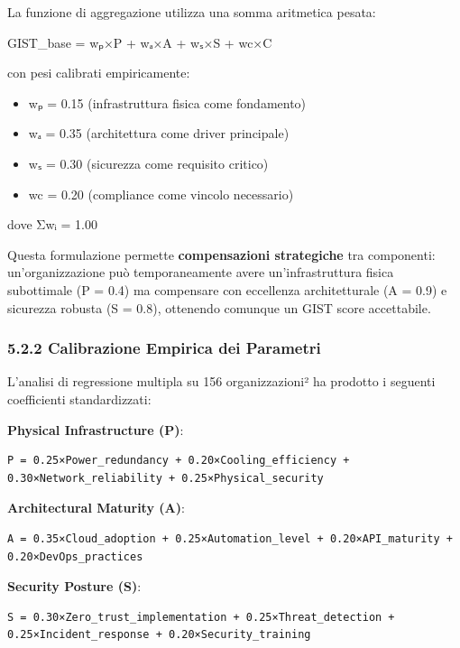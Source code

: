 \documentclass[12pt,a4paper,oneside]{book}
\providecommand{\tightlist}{%
  \setlength{\itemsep}{0pt}\setlength{\parskip}{0pt}
}
\begin{document}
La funzione di aggregazione utilizza una somma aritmetica pesata:

GIST\_base = wₚ×P + wₐ×A + wₛ×S + wc×C

con pesi calibrati empiricamente:

\begin{itemize}
\tightlist
\item
  wₚ = 0.15 (infrastruttura fisica come fondamento)\\
\item
  wₐ = 0.35 (architettura come driver principale)\\
\item
  wₛ = 0.30 (sicurezza come requisito critico)\\
\item
  wc = 0.20 (compliance come vincolo necessario)
\end{itemize}

dove Σwᵢ = 1.00

Questa formulazione permette \textbf{compensazioni strategiche} tra
componenti: un'organizzazione può temporaneamente avere
un'infrastruttura fisica subottimale (P = 0.4) ma compensare con
eccellenza architetturale (A = 0.9) e sicurezza robusta (S = 0.8),
ottenendo comunque un GIST score accettabile.

\subsubsection{5.2.2 Calibrazione Empirica dei
Parametri}\label{calibrazione-empirica-dei-parametri}

L'analisi di regressione multipla su 156 organizzazioni² ha prodotto i
seguenti coefficienti standardizzati:

\textbf{Physical Infrastructure (P)}:

\begin{verbatim}
P = 0.25×Power_redundancy + 0.20×Cooling_efficiency + 0.30×Network_reliability + 0.25×Physical_security
\end{verbatim}

\textbf{Architectural Maturity (A)}:

\begin{verbatim}
A = 0.35×Cloud_adoption + 0.25×Automation_level + 0.20×API_maturity + 0.20×DevOps_practices
\end{verbatim}

\textbf{Security Posture (S)}:

\begin{verbatim}
S = 0.30×Zero_trust_implementation + 0.25×Threat_detection + 0.25×Incident_response + 0.20×Security_training
\end{verbatim}
\end{document}
